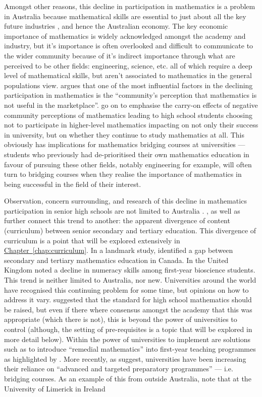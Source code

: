 \documentclass[twoside,12pt,a4paper]{report}
\newcommand{\refchap}[1]{\hyperref[chap:#1]{Chapter~\ref{chap:#1}}}
\begin{document}
Amongst other reasons, this decline in participation in mathematics is a problem in Australia because mathematical skills are essential to just about all the key future industries \cite{Croft2009}, and hence the Australian economy. The key economic importance of mathematics is widely acknowledged amongst the academy and industry, but it's importance is often overlooked and difficult to communicate to the wider community because of it's indirect importance through what are perceived to be other fields: engineering, science, etc. all of which require a deep level of mathematical skills, but aren't associated to mathematics in the general populations view.  argues that one of the most influential factors in the declining participation in mathematics is the ``community's perception that mathematics is not useful in the marketplace''.  go on to  emphasise the carry-on effects of negative community perceptions of mathematics leading to high school students choosing not to participate in higher-level mathematics impacting on not only their success in university, but on whether they continue to study mathematics at all. This obviously has implications for mathematics bridging courses at universities --- students who previously had de-prioritised their own mathematics education in favour of pursuing these other fields, notably engineering for example, will often turn to bridging courses when they realise the importance of mathematics in being successful in the field of their interest.

Observation, concern surrounding, and research of this decline in mathematics participation in senior high schools are not limited to Australia \cite{Hourigan2007, Hoyles2001}. ,  as well as  further connect this trend to another: the apparent divergence of content (curriculum) between senior secondary and tertiary education. This divergence of curriculum is a point that will be explored extensively in \refchap{curriculum}. In a landmark study,  identified a gap between secondary and tertiary mathematics education in Canada. In the United Kingdom  noted a decline in numeracy skills among first-year bioscience students. This trend is neither limited to Australia, nor new. Universities around the world have recognised this continuing problem for some time, but opinions on how to address it vary.  suggested that the standard for high school mathematics should be raised, but even if there where consensus amongst the academy that this was appropriate (which there is not), this is beyond the power of universities to control (although, the setting of pre-requisites is a topic that will be explored in more detail below). Within the power of universities to implement are solutions such as to introduce ``remedial mathematics'' into first-year teaching programmes as highlighted by . More recently, as  suggest, universities have been increasing their reliance on ``advanced and targeted preparatory programmes'' --- i.e. bridging courses. As an example of this from outside Australia,  note that at the University of Limerick in Ireland 
\end{document}
